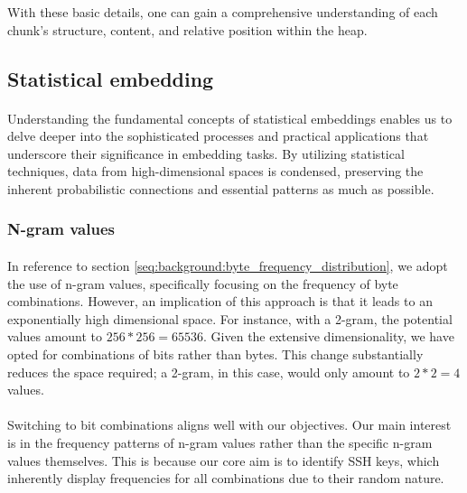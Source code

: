     With these basic details, one can gain a comprehensive understanding of each chunk's structure, content, and relative position within the heap.

\subsection{Statistical embedding}
    \paragraph{}Understanding the fundamental concepts of statistical embeddings enables us to delve deeper into the sophisticated processes and practical applications that underscore their significance in embedding tasks. By utilizing statistical techniques, data from high-dimensional spaces is condensed, preserving the inherent probabilistic connections and essential patterns as much as possible.

    \subsubsection{N-gram values}
        \paragraph{}In reference to section \ref{seq:background:byte_frequency_distribution}, we adopt the use of n-gram values, specifically focusing on the frequency of byte combinations. However, an implication of this approach is that it leads to an exponentially high dimensional space. For instance, with a 2-gram, the potential values amount to $256*256=65536$. Given the extensive dimensionality, we have opted for combinations of bits rather than bytes. This change substantially reduces the space required; a 2-gram, in this case, would only amount to $2*2=4$ values.

        \paragraph{}Switching to bit combinations aligns well with our objectives. Our main interest is in the frequency patterns of n-gram values rather than the specific n-gram values themselves. This is because our core aim is to identify SSH keys, which inherently display frequencies for all combinations due to their random nature.

